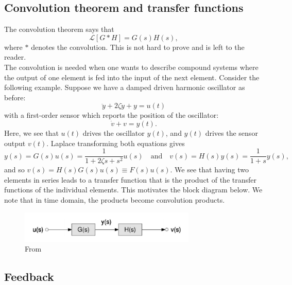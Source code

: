 \documentclass{book}
\theoremstyle{definition}
\newcommand{\lag}{\mathcal{L}}
\newcommand{\f}[2]{\frac{#1}{#2}}
\begin{document}
\subsection*{Convolution theorem and transfer functions}


The convolution theorem says that
\begin{equation*}
\lag[G\ast H] = G(s)H(s),
\end{equation*} 
where $\ast$ denotes the convolution. This is not hard to prove and is left to the reader. \\


The convolution is needed when one wants to describe compound systems where the output of one element is fed into the input of the next element. Consider the following example. Suppose we have a damped driven harmonic oscillator as before: 
\begin{equation*}
\ddot{y} + 2\zeta \dot{y} + y = u(t)
\end{equation*}
with a first-order sensor which reports the position of the oscillator:
\begin{equation*}
\dot{v} + v = y(t). 
\end{equation*}
Here, we see that $u(t)$ drives the oscillator $y(t)$, and $y(t)$ drives the sensor output $v(t)$. Laplace transforming both equations gives
\begin{equation*}
y(s) = G(s)u(s) = \f{1}{1 + 2\zeta s + s^2}u(s) \quad \text{and} \quad v(s) = H(s)y(s) = \f{1}{1+s} y(s),
\end{equation*}
and so $v(s) = H(s) G(s) u(s) \equiv F(s) u(s)$. We see that having two elements in series leads to a transfer function that is the product
of the transfer functions of the individual elements. This motivates the block diagram below. We note that in time domain, the products become convolution products. 


\begin{figure}[!htb]
	\centering
	\includegraphics[width=0.75\textwidth]{images/block-1}
	\caption{From \cite{bechhoefer2005feedback}}
\end{figure}


\subsection*{Feedback}
\end{document}
